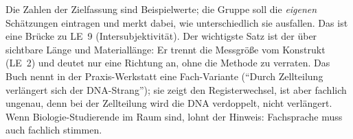 \begin{lehrhinweis}
Die Zahlen der Zielfassung sind Beispielwerte; die Gruppe soll die
\emph{eigenen} Schätzungen eintragen und merkt dabei, wie unterschiedlich
sie ausfallen. Das ist eine Brücke zu LE~9 (Intersubjektivität). Der
wichtigste Satz ist der über sichtbare Länge und Materiallänge: Er trennt
die Messgröße vom Konstrukt (LE~2) und deutet nur eine Richtung an, ohne
die Methode zu verraten. Das Buch nennt in der Praxis-Werkstatt eine
Fach-Variante (\enquote{Durch Zellteilung verlängert sich der
DNA-Strang}); sie zeigt den Registerwechsel, ist aber fachlich ungenau,
denn bei der Zellteilung wird die DNA verdoppelt, nicht verlängert. Wenn
Biologie-Studierende im Raum sind, lohnt der Hinweis: Fachsprache muss
auch fachlich stimmen.
\end{lehrhinweis}

